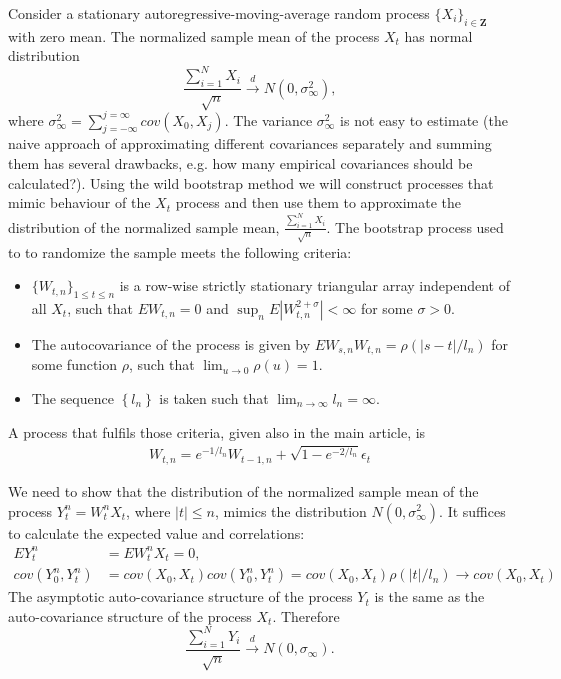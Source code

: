 \documentclass{article} %
\newcommand{\ev}{E}
\begin{document}
Consider a stationary autoregressive-moving-average random process $\{X_i\}_{i \in \mathbf{Z}}$ with zero mean. The normalized sample mean of the process $X_t$ has normal distribution
\begin{equation}
\frac{\sum_{i=1}^{N} X_i}{\sqrt{n}} \overset{d}{\to} N(0,\sigma_{\infty}^{2}),    
\end{equation}      
where $\sigma_{\infty}^2 = \sum_{j=-\infty}^{j=\infty} cov(X_0,X_j)$. The variance $\sigma_{\infty}^2$ is not easy to estimate (the naive approach of approximating different covariances separately and summing them has several drawbacks, e.g. how many empirical covariances should be calculated?). Using the wild bootstrap method we will construct processes that mimic behaviour of the $X_t$ process and then use them to approximate the distribution of the normalized sample mean, $\frac{\sum_{i=1}^{N} X_i}{\sqrt{n}}$. The bootstrap process used to to randomize the sample meets the following criteria: 
\begin{itemize}
\item $\{W_{t,n}\}_{1 \leq t \leq n }$ is a row-wise strictly stationary triangular array independent of all $X_t$, such that $\ev W_{t,n}=0$ and $\sup_{n} \ev|W_{t,n}^{2+\sigma}| < \infty$ for some $\sigma > 0$. 
\item The autocovariance of the process is given by $\ev W_{s,n} W_{t,n}=\rho(|s-t|/l_n)$ for some function $\rho$, such that $\lim_{u \to 0} \rho(u) = 1$. 
\item The sequence $\left\{l_n\right\}$ is taken such that $\lim_{n \to \infty} l_n = \infty$.
\end{itemize}
A process that fulfils those criteria, given also in the main article, is
\begin{align}
W_{t,n} = e^{-1/l_n}W_{t-1,n} + \sqrt{1 -e^{-2/l_n}} \epsilon_t
\end{align} 
  
We need to show that the distribution of the normalized sample mean of the process  $Y_t^{n} = W_t^{n}X_t$, where $|t| \leq n$, mimics the distribution $N(0,\sigma_{\infty}^2)$. It suffices to calculate the expected value and correlations:   
\begin{align}
\ev Y_t^{n} &= \ev W_t^n X_t = 0 ,\\
cov(Y_0^n,Y_t^n) &= cov(X_0,X_t)cov(Y_0^n,Y_t^n) = cov(X_0,X_t)\rho(|t|/l_n) \to cov(X_0,X_t)
\end{align}
The asymptotic auto-covariance structure of the process $Y_t$ is the same as the auto-covariance structure of the process $X_t$. Therefore 
\begin{equation}
\frac{\sum_{i=1}^{N} Y_i}{\sqrt{n}} \overset{d}{\to} N(0,\sigma_{\infty}).    
\end{equation}  
\end{document}
